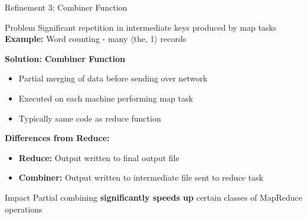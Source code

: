 \documentclass[aspectratio=169]{beamer}
\begin{document}
\begin{frame}{Refinement 3: Combiner Function}
\begin{block}{Problem}
Significant repetition in intermediate keys produced by map tasks \\
\textbf{Example:} Word counting - many $\langle$the, 1$\rangle$ records
\end{block}

\vspace{0.3cm}

\textbf{Solution: Combiner Function}
\begin{itemize}
    \item Partial merging of data \alert{before} sending over network
    \item Executed on each machine performing map task
    \item Typically same code as reduce function
\end{itemize}

\vspace{0.3cm}

\textbf{Differences from Reduce:}
\begin{itemize}
    \item \textbf{Reduce:} Output written to final output file
    \item \textbf{Combiner:} Output written to intermediate file sent to reduce task
\end{itemize}

\vspace{0.3cm}

\begin{exampleblock}{Impact}
Partial combining \textbf{significantly speeds up} certain classes of MapReduce operations
\end{exampleblock}
\end{frame}
\end{document}
